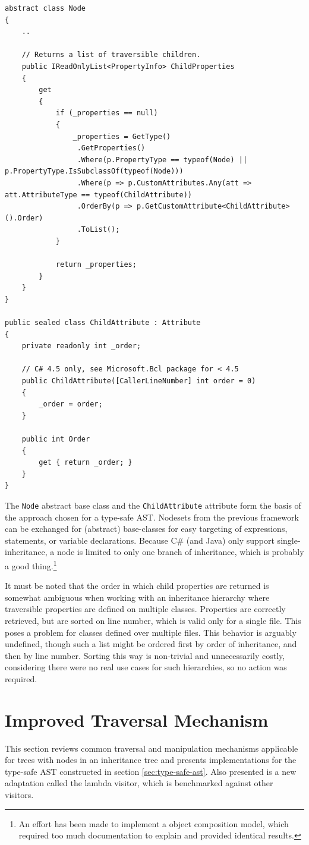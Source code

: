 \documentclass[twoside,openright]{uva-bachelor-thesis}
\newcommand{\code}[1]{\texttt{\footnotesize#1}}
\begin{document}
		\begin{lstlisting}[caption=Updated code for the base class and attribute,label=reflection-base]	
abstract class Node
{
	..
	
	// Returns a list of traversible children.
	public IReadOnlyList<PropertyInfo> ChildProperties
	{
		get
		{
			if (_properties == null)
			{
				_properties = GetType()
				 .GetProperties()
				 .Where(p.PropertyType == typeof(Node) || p.PropertyType.IsSubclassOf(typeof(Node)))
				 .Where(p => p.CustomAttributes.Any(att => att.AttributeType == typeof(ChildAttribute))
				 .OrderBy(p => p.GetCustomAttribute<ChildAttribute>().Order)
				 .ToList();
			}
			
			return _properties;
		}
	}
}

public sealed class ChildAttribute : Attribute
{
	private readonly int _order;
	
	// C# 4.5 only, see Microsoft.Bcl package for < 4.5
	public ChildAttribute([CallerLineNumber] int order = 0)
	{
		_order = order;
	}
	
	public int Order
	{
		get { return _order; }
	}
}
		\end{lstlisting}
		
		The \code{Node} abstract base class and the \code{ChildAttribute} attribute form the basis of the approach chosen for a type-safe AST. Nodesets from the previous framework can be exchanged for (abstract) base-classes for easy targeting of expressions, statements, or variable declarations. Because C\# (and Java) only support single-inheritance, a node is limited to only one branch of inheritance, which is probably a good thing.\footnote{An effort has been made to implement a object composition model, which required too much documentation to explain and provided identical results.}
	
		It must be noted that the order in which child properties are returned is somewhat ambiguous when working with an inheritance hierarchy where traversible properties are defined on multiple classes. Properties are correctly retrieved, but are sorted on line number, which is valid only for a single file. This poses a problem for classes defined over multiple files. This behavior is arguably undefined, though such a list might be ordered first by order of inheritance, and then by line number. Sorting this way is non-trivial and unnecessarily costly, considering there were no real use cases for such hierarchies, so no action was required.
					
	\section{Improved Traversal Mechanism}
		This section reviews common traversal and manipulation mechanisms applicable for trees with nodes in an inheritance tree and presents implementations for the type-safe AST constructed in section \ref{sec:type-safe-ast}. Also presented is a new adaptation called the lambda visitor, which is benchmarked against other visitors.
				
\end{document}
